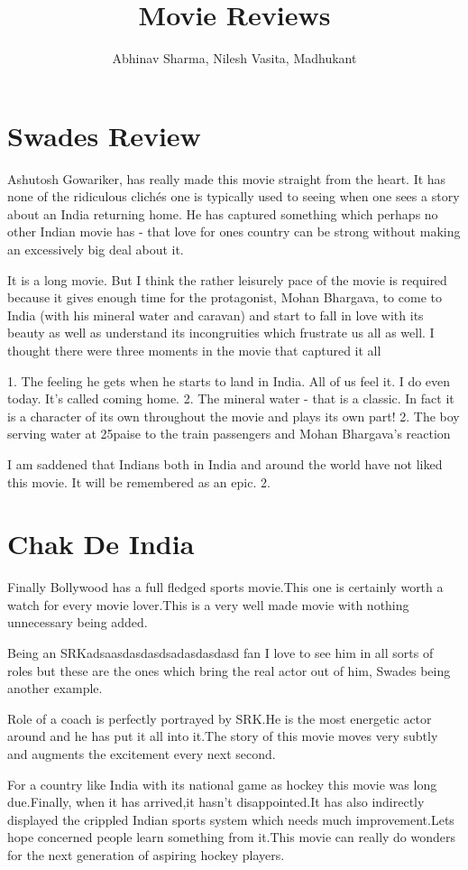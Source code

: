 \documentclass[]{article}
\title{Movie Reviews}
\author{Abhinav Sharma, Nilesh Vasita, Madhukant}
\date
\begin{document}
\maketitle
\section{Swades Review}
Ashutosh Gowariker, has really made this movie straight from the heart. It has none of the ridiculous clichés one is typically used to seeing when one sees a story about an India returning home. He has captured something which perhaps no other Indian movie has - that love for ones country can be strong without making an excessively big deal about it.

It is a long movie. But I think the rather leisurely pace of the movie is required because it gives enough time for the protagonist, Mohan Bhargava, to come to India (with his mineral water and caravan) and start to fall in love with its beauty as well as understand its incongruities which frustrate us all as well. I thought there were three moments in the movie that captured it all

1. The feeling he gets when he starts to land in India. All of us feel it. I do even today. It's called coming home. 2. The mineral water - that is a classic. In fact it is a character of its own throughout the movie and plays its own part! 2. The boy serving water at 25paise to the train passengers and Mohan Bhargava's reaction

I am saddened that Indians both in India and around the world have not liked this movie. It will be remembered as an epic. 2.

\section{Chak De India}
Finally Bollywood has a full fledged sports movie.This one is certainly worth a watch for every movie lover.This is a very well made movie with nothing unnecessary being added.


Being an SRKadsaasdasdasdsadasdasdasd fan I love to see him in all sorts of roles but these are the ones which bring the real actor out of him, Swades being another example.

Role of a coach is perfectly portrayed by SRK.He is the most energetic actor around and he has put it all into it.The story of this movie moves very subtly and augments the excitement every next second.

For a country like India with its national game as hockey this movie was long due.Finally, when it has arrived,it hasn't disappointed.It has also indirectly displayed the crippled Indian sports system which needs much improvement.Lets hope concerned people learn something from it.This movie can really do wonders for the next generation of aspiring hockey players.
\end{document}
